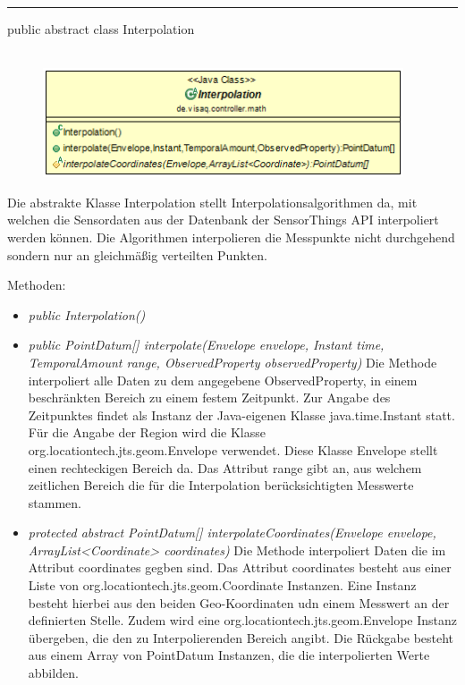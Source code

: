 \rule{\textwidth}{0.4pt}
public abstract class Interpolation
\\\\
\begin{minipage}{0.5\textwidth}
    \begin{figure}[H]
        {\centering\includegraphics[width=0.95\textwidth]{media/backend/controller/classes/Interpolation.png}}
    \end{figure}
    \end{minipage} \hfill
\begin{minipage}{0.5\textwidth}
    Die abstrakte Klasse Interpolation stellt Interpolationsalgorithmen da, mit welchen die Sensordaten aus der Datenbank der \gls{SensorThings API} interpoliert werden können.
    Die Algorithmen interpolieren die Messpunkte nicht durchgehend sondern nur an gleichmäßig verteilten Punkten.
\end{minipage}

Methoden:
\begin{itemize}
    \item \emph{public Interpolation()}
    \item \emph{public PointDatum[] interpolate(Envelope envelope, Instant time, TemporalAmount range, ObservedProperty observedProperty)}
    Die Methode interpoliert alle Daten zu dem angegebene ObservedProperty, in einem beschränkten Bereich zu einem festem Zeitpunkt.
    Zur Angabe des Zeitpunktes findet als Instanz der Java-eigenen Klasse java.time.Instant statt.
    Für die Angabe der Region wird die Klasse org.locationtech.jts.geom.Envelope verwendet.
    Diese Klasse Envelope stellt einen rechteckigen Bereich da.
    Das Attribut range gibt an, aus welchem zeitlichen Bereich die für die Interpolation berücksichtigten Messwerte stammen.
    \item \emph{protected abstract PointDatum[] interpolateCoordinates(Envelope envelope, ArrayList<Coordinate> coordinates)}
    Die Methode interpoliert Daten die im Attribut coordinates gegben sind.
    Das Attribut coordinates besteht aus einer Liste von org.locationtech.jts.geom.Coordinate Instanzen.
    Eine Instanz besteht hierbei aus den beiden Geo-Koordinaten udn einem Messwert an der definierten Stelle.
    Zudem wird eine org.locationtech.jts.geom.Envelope Instanz übergeben, die den zu Interpolierenden Bereich angibt.
    Die Rückgabe besteht aus einem Array von PointDatum Instanzen, die die interpolierten Werte abbilden.
\end{itemize}

